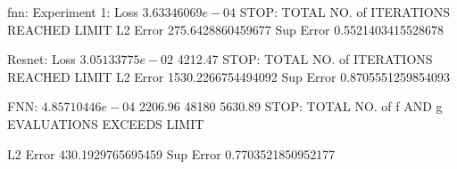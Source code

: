 fnn: Experiment 1: Loss $3.63346069e-04$ 
STOP: TOTAL NO. of ITERATIONS REACHED LIMIT
L2 Error 275.6428860459677
Sup Error 0.5521403415528678



Resnet: Loss  $3.05133775e-02$   4212.47
STOP: TOTAL NO. of ITERATIONS REACHED LIMIT
L2 Error 1530.2266754494092
Sup Error 0.8705551259854093

FNN: $4.85710446e-04$  2206.96
48180     5630.89
STOP: TOTAL NO. of f AND g EVALUATIONS EXCEEDS LIMIT

L2 Error 430.1929765695459
Sup Error 0.7703521850952177
